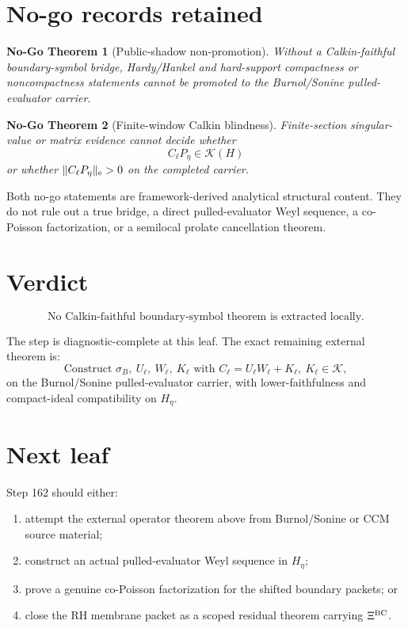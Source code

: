 \documentclass[11pt]{article}
\newtheorem{nogo}{No-Go Theorem}
\begin{document}
\section{No-go records retained}

\begin{nogo}[Public-shadow non-promotion]
Without a Calkin-faithful boundary-symbol bridge, Hardy/Hankel and
hard-support compactness or noncompactness statements cannot be promoted to
the Burnol/Sonine pulled-evaluator carrier.
\end{nogo}

\begin{nogo}[Finite-window Calkin blindness]
Finite-section singular-value or matrix evidence cannot decide whether
\[
  C_\ell P_\eta\in\mathcal K(H)
\]
or whether \(\|C_\ell P_\eta\|_{\rm e}>0\) on the completed carrier.
\end{nogo}

Both no-go statements are framework-derived analytical structural content.
They do not rule out a true bridge, a direct pulled-evaluator Weyl sequence, a
co-Poisson factorization, or a semilocal prolate cancellation theorem.

\section{Verdict}

\[
\boxed{\text{No Calkin-faithful boundary-symbol theorem is extracted locally.}}
\]

The step is diagnostic-complete at this leaf.  The exact remaining external
theorem is:
\[
  \boxed{
  \text{Construct }\sigma_B,\ U_\ell,\ W_\ell,\ K_\ell
  \text{ with }
  C_\ell=U_\ell W_\ell+K_\ell,\ K_\ell\in\mathcal K,
  }
\]
on the Burnol/Sonine pulled-evaluator carrier, with lower-faithfulness and
compact-ideal compatibility on \(H_\eta\).

\section{Next leaf}

Step 162 should either:
\begin{enumerate}[label=(\alph*)]
  \item attempt the external operator theorem above from Burnol/Sonine or CCM
  source material;
  \item construct an actual pulled-evaluator Weyl sequence in \(H_\eta\);
  \item prove a genuine co-Poisson factorization for the shifted boundary
  packets; or
  \item close the RH membrane packet as a scoped residual theorem carrying
  \(\Xi^{\rm BC}\).
\end{enumerate}
\end{document}
